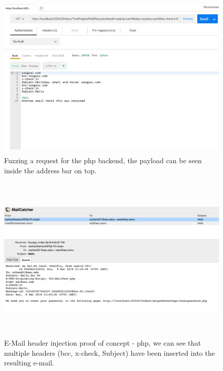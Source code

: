 \begin{figure}[!htbp]
	\centering
	\includegraphics[width=14cm, height=8cm]{System/EMI_Postman_PHP}
	\caption[]{Fuzzing a request for the php backend, the payload can be seen inside the address bar on top.}
	\label{fig:postmanphp}
\end{figure}

\begin{figure}[!htbp]
	\centering
	\includegraphics[width=14cm, height=8cm]{System/EMI_Mailcatcher_PHP}
	\caption[]{E-Mail header injection proof of concept - php, we can see that multiple headers (bcc, x-check, Subject) have been inserted into the resulting e-mail.}
	\label{fig:mailcatcherphp}
\end{figure}